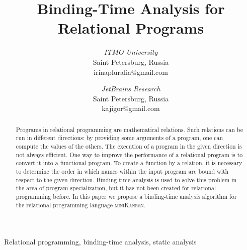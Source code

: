\documentclass[conference,a4paper,american]{IEEEtran}
\newcommand{\miniKanren}{\textsc{miniKanren}}
\begin{document}
\title{Binding-Time Analysis for Relational Programs}

\author{
\textit{ITMO University} \\
Saint Petersburg, Russia \\
irinapluralia@gmail.com
\and
{}
\textit{JetBrains Research}\\
Saint Petersburg, Russia \\
kajigor@gmail.com
}


\maketitle

\begin{abstract}
Programs in relational programming are mathematical relations.
Such relations can be run in different directions: by providing some arguments of a program, one can compute the values of the others.
The execution of a program in the given direction is not always efficient.
One way to improve the performance of a relational program is to convert it into a functional program.
To create a function by a relation, it is necessary to determine the order in which names within the input program are bound with respect to the given direction.
Binding-time analysis is used to solve this problem in the area of program specialization, but it has not been created for relational programming before.
In this paper we propose a binding-time analysis algorithm for the relational programming language \miniKanren{}.
\end{abstract}

\begin{IEEEkeywords}
Relational programming, binding-time analysis, static analysis
\end{IEEEkeywords}
\end{document}
